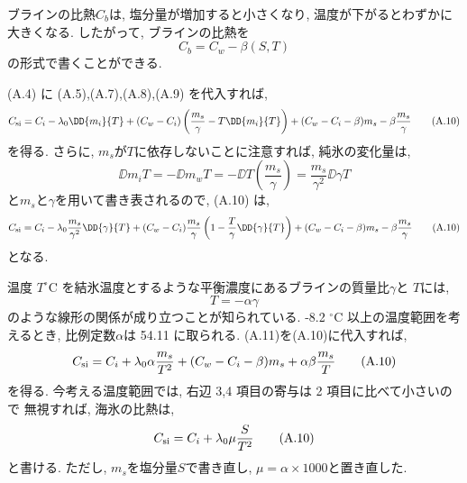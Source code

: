ブラインの比熱$C_b$は, 塩分量が増加すると小さくなり,
温度が下がるとわずかに大きくなる. したがって, ブラインの比熱を
\begin{equation*}
 C_b = C_w  - \beta(S,T)
 \tag{A.9}  
\end{equation*}
の形式で書くことができる.

(A.4) に (A.5),(A.7),(A.8),(A.9) を代入すれば,
\begin{equation*}
 C_{\rm si} =
  C_i - \lambda_0 \DD{m_i}{T}
  + (C_w - C_i)\left(\dfrac{m_s}{\gamma} - T\DD{m_i}{T} \right)
  + (C_w - C_i - \beta)m_s - \beta\dfrac{m_s}{\gamma}
  \tag{A.10}
\end{equation*}
を得る.
さらに,
$m_s$が$T$に依存しないことに注意すれば, 純氷の変化量は,
$$
 \DD{m_i}{T} = - \DD{m_w}{T} = - \DD{}{T}\left(\dfrac{m_s}{\gamma}\right)
 = \dfrac{m_s}{\gamma^2}\DD{\gamma}{T}
 $$
 と$m_s$と$\gamma$を用いて書き表されるので, (A.10) は,
 \begin{equation*}
 C_{\rm si} =
  C_i - \lambda_0 \dfrac{m_s}{\gamma^2}\DD{\gamma}{T}
  + (C_w - C_i) \dfrac{m_s}{\gamma} \left(1 - \dfrac{T}{\gamma}\DD{\gamma}{T} \right)
  + (C_w - C_i - \beta)m_s - \beta\dfrac{m_s}{\gamma}
  \tag{A.10}  
 \end{equation*}
 となる.

 温度 $T ^\circ$C を結氷温度とするような平衡濃度にあるブラインの質量比$\gamma$と
 $T$には,
 \begin{equation*}
  T = - \alpha \gamma
  \tag{A.11}
 \end{equation*}
 のような線形の関係が成り立つことが知られている.
 -8.2 $^\circ$C 以上の温度範囲を考えるとき, 
 比例定数$\alpha$は 54.11 に取られる.
 (A.11)を(A.10)に代入すれば,
 \begin{equation*}
 C_{\rm si} =
  C_i + \lambda_0 \alpha \dfrac{m_s}{T^2}
  + (C_w - C_i - \beta)m_s + \alpha \beta\dfrac{m_s}{T}
  \tag{A.10}  
 \end{equation*}
 を得る.
 今考える温度範囲では, 右辺 3,4 項目の寄与は 2 項目に比べて小さい\citep{ono1967specific}ので
 無視すれば, 海氷の比熱は,
 \begin{equation*}
 C_{\rm si} =
  C_i + \lambda_0 \mu \dfrac{S}{T^2}
  \tag{A.10}  
 \end{equation*}
 と書ける.
 ただし, $m_s$を塩分量$S$で書き直し, $\mu = \alpha \times 1000$と置き直した. 